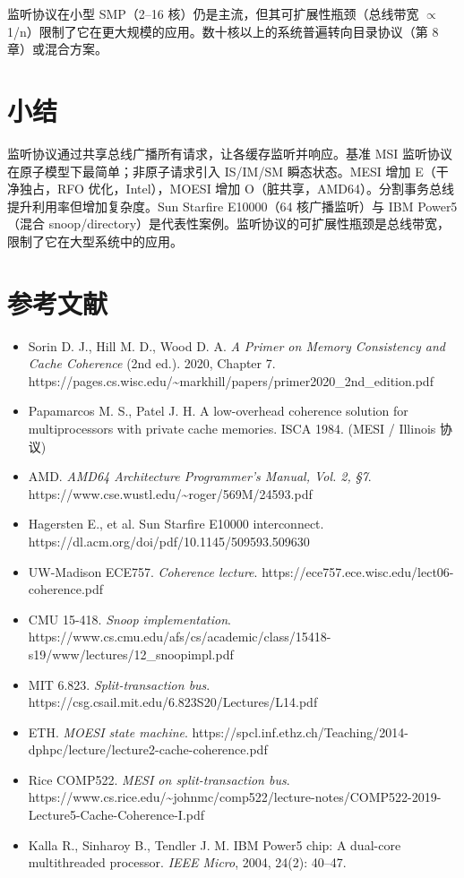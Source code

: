 监听协议在小型 SMP（2–16 核）仍是主流，但其可扩展性瓶颈（总线带宽 $\propto$ 1/n）限制了它在更大规模的应用。数十核以上的系统普遍转向目录协议（第 8 章）或混合方案。

\section{小结}

监听协议通过共享总线广播所有请求，让各缓存监听并响应。基准 MSI 监听协议在原子模型下最简单；非原子请求引入 IS/IM/SM 瞬态状态。MESI 增加 E（干净独占，RFO 优化，Intel），MOESI 增加 O（脏共享，AMD64）。分割事务总线提升利用率但增加复杂度。Sun Starfire E10000（64 核广播监听）与 IBM Power5（混合 snoop/directory）是代表性案例。监听协议的可扩展性瓶颈是总线带宽，限制了它在大型系统中的应用。

\section*{参考文献}
\begin{itemize}
\item Sorin D. J., Hill M. D., Wood D. A. \emph{A Primer on Memory Consistency and Cache Coherence} (2nd ed.). 2020, Chapter 7. https://pages.cs.wisc.edu/\textasciitilde{}markhill/papers/primer2020\_2nd\_edition.pdf
\item Papamarcos M. S., Patel J. H. A low-overhead coherence solution for multiprocessors with private cache memories. ISCA 1984. (MESI / Illinois 协议)
\item AMD. \emph{AMD64 Architecture Programmer's Manual, Vol. 2, §7}. https://www.cse.wustl.edu/\textasciitilde{}roger/569M/24593.pdf
\item Hagersten E., et al. Sun Starfire E10000 interconnect. https://dl.acm.org/doi/pdf/10.1145/509593.509630
\item UW-Madison ECE757. \emph{Coherence lecture}. https://ece757.ece.wisc.edu/lect06-coherence.pdf
\item CMU 15-418. \emph{Snoop implementation}. https://www.cs.cmu.edu/afs/cs/academic/class/15418-s19/www/lectures/12\_snoopimpl.pdf
\item MIT 6.823. \emph{Split-transaction bus}. https://csg.csail.mit.edu/6.823S20/Lectures/L14.pdf
\item ETH. \emph{MOESI state machine}. https://spcl.inf.ethz.ch/Teaching/2014-dphpc/lecture/lecture2-cache-coherence.pdf
\item Rice COMP522. \emph{MESI on split-transaction bus}. https://www.cs.rice.edu/\textasciitilde{}johnmc/comp522/lecture-notes/COMP522-2019-Lecture5-Cache-Coherence-I.pdf
\item Kalla R., Sinharoy B., Tendler J. M. IBM Power5 chip: A dual-core multithreaded processor. \emph{IEEE Micro}, 2004, 24(2): 40–47.
\end{itemize}
